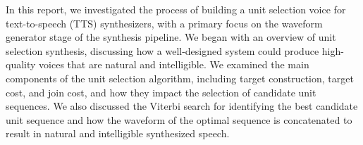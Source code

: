 \documentclass[lettersize,journal]{IEEEtran}
\begin{document}


In this report, we investigated the process of building a unit selection voice for text-to-speech (TTS) synthesizers, with a primary focus on the waveform generator stage of the synthesis pipeline. We began with an overview of unit selection synthesis, discussing how a well-designed system could produce high-quality voices that are natural and intelligible. We examined the main components of the unit selection algorithm, including target construction, target cost, and join cost, and how they impact the selection of candidate unit sequences. We also discussed the Viterbi search for identifying the best candidate unit sequence and how the waveform of the optimal sequence is concatenated to result in natural and intelligible synthesized speech.
\end{document}
